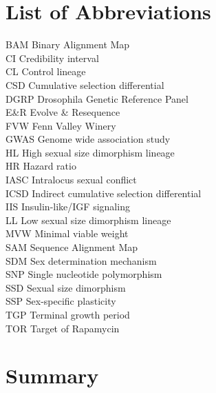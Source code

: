 \documentclass[12pt,reqno,oneside]{report}
\begin{document}
\chapter*{List of Abbreviations}
\begin{doublespacing}

BAM  \tabto{3cm} Binary Alignment Map \\
CI   \tabto{3cm} Credibility interval \\
CL   \tabto{3cm} Control lineage\\
CSD  \tabto{3cm} Cumulative selection differential\\
DGRP \tabto{3cm} Drosophila Genetic Reference Panel\\
E\&R \tabto{3cm} Evolve \& Resequence\\
FVW  \tabto{3cm} Fenn Valley Winery\\
GWAS \tabto{3cm} Genome wide association study\\
HL   \tabto{3cm} High sexual size dimorphism lineage\\
HR   \tabto{3cm} Hazard ratio \\
IASC \tabto{3cm} Intralocus sexual conflict\\
ICSD \tabto{3cm} Indirect cumulative selection differential \\
IIS  \tabto{3cm} Insulin-like/IGF signaling\\
LL   \tabto{3cm} Low sexual size dimorphism lineage\\
MVW  \tabto{3cm} Minimal viable weight\\
SAM  \tabto{3cm} Sequence Alignment Map \\
SDM  \tabto{3cm} Sex determination mechanism\\
SNP  \tabto{3cm} Single nucleotide polymorphism\\
SSD  \tabto{3cm} Sexual size dimorphism\\
SSP  \tabto{3cm} Sex-specific plasticity\\
TGP  \tabto{3cm} Terminal growth period\\
TOR  \tabto{3cm}  Target of Rapamycin\\
\end{doublespacing}

\newpage
\thispagestyle{plain}
\chapter*{Summary}
\setlength{\parindent}{24pt} 
\doublespacing
\end{document}
